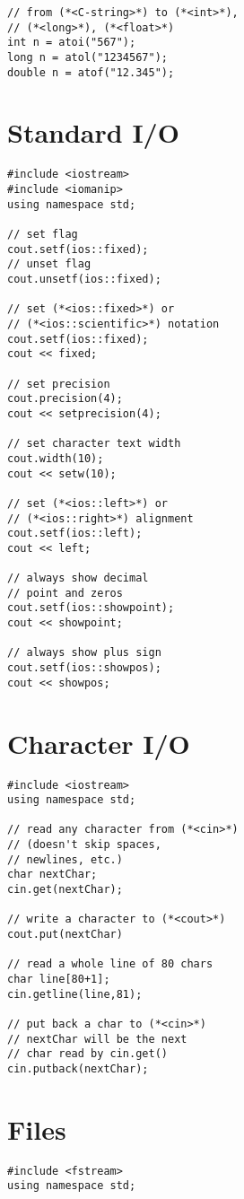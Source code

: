 \documentclass[10pt]{article}
\begin{document}
\begin{multicols*}{3}
\begin{lstlisting}
// from (*<C-string>*) to (*<int>*),
// (*<long>*), (*<float>*)
int n = atoi("567");
long n = atol("1234567");
double n = atof("12.345");
\end{lstlisting}
%
%
\section*{Standard I/O}
\small
\lstset {language=C++}
\begin{lstlisting}
#include <iostream>
#include <iomanip>
using namespace std;

// set flag
cout.setf(ios::fixed);
// unset flag
cout.unsetf(ios::fixed);

// set (*<ios::fixed>*) or 
// (*<ios::scientific>*) notation
cout.setf(ios::fixed);
cout << fixed;

// set precision
cout.precision(4);
cout << setprecision(4);

// set character text width
cout.width(10);
cout << setw(10);

// set (*<ios::left>*) or
// (*<ios::right>*) alignment
cout.setf(ios::left);
cout << left;

// always show decimal
// point and zeros
cout.setf(ios::showpoint);
cout << showpoint;

// always show plus sign
cout.setf(ios::showpos);
cout << showpos;
\end{lstlisting}
%
%
\section*{Character I/O}
\small
\lstset {language=C++}
\begin{lstlisting}
#include <iostream>
using namespace std;

// read any character from (*<cin>*)
// (doesn't skip spaces, 
// newlines, etc.)
char nextChar;
cin.get(nextChar);

// write a character to (*<cout>*)
cout.put(nextChar)

// read a whole line of 80 chars
char line[80+1];
cin.getline(line,81);

// put back a char to (*<cin>*)
// nextChar will be the next
// char read by cin.get()
cin.putback(nextChar);
\end{lstlisting}
%
%
\section*{Files}
\small
\lstset {language=C++}
\begin{lstlisting}
#include <fstream>
using namespace std;


\end{lstlisting}
\end{multicols*}
\end{document}

